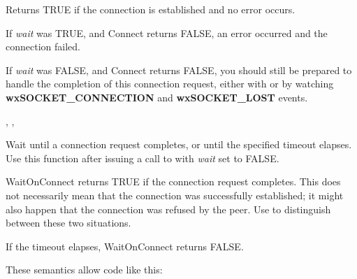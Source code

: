 



Returns TRUE if the connection is established and no error occurs.

If {\it wait} was TRUE, and Connect returns FALSE, an error occurred
and the connection failed.

If {\it wait} was FALSE, and Connect returns FALSE, you should still
be prepared to handle the completion of this connection request, either
with  or by
watching {\bf wxSOCKET\_CONNECTION} and {\bf wxSOCKET\_LOST} events.


, 
, 

%
%
\label{wxsocketclientwaitonconnect}


Wait until a connection request completes, or until the specified timeout
elapses. Use this function after issuing a call
to  with {\it wait} set to FALSE.





WaitOnConnect returns TRUE if the connection request completes. This
does not necessarily mean that the connection was successfully established;
it might also happen that the connection was refused by the peer. Use 
 to distinguish between
these two situations.

If the timeout elapses, WaitOnConnect returns FALSE.

These semantics allow code like this:

